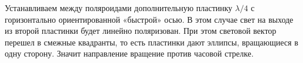 \documentclass[12pt]{article}
\begin{document}
\begin{enumerate}
        Устанавливаем между поляроидами дополнительную пластинку $\lambda/4$ с горизонтально ориентированной «быстрой» осью.
        В этом случае свет на выходе из второй пластинки будет линейно поляризован.
        При этом световой вектор перешел в смежные квадранты, то есть пластинки дают эллипсы, вращающиеся в одну сторону.
        Значит направление вращение против часовой стрелке.
    \end{enumerate}
\end{document}
